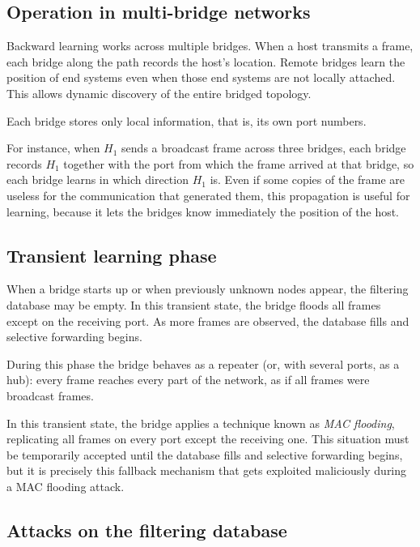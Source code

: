 \subsection{Operation in multi-bridge networks}

Backward learning works across multiple bridges. When a host transmits a frame, each bridge along the path records the host's location. Remote bridges learn the position of end systems even when those end systems are not locally attached. This allows dynamic discovery of the entire bridged topology.

Each bridge stores only local information, that is, its own port numbers. 

\begin{center}
\end{center}

For instance, when $H_1$ sends a broadcast frame across three bridges, each bridge records $H_1$ together with the port from which the frame arrived at that bridge, so each bridge learns in which direction $H_1$ is. Even if some copies of the frame are useless for the communication that generated them, this propagation is useful for learning, because it lets the bridges know immediately the position of the host.

\subsection{Transient learning phase}

When a bridge starts up or when previously unknown nodes appear, the filtering database may be empty. In this transient state, the bridge floods all frames except on the receiving port. As more frames are observed, the database fills and selective forwarding begins.

During this phase the bridge behaves as a repeater (or, with several ports, as a hub): every frame reaches every part of the network, as if all frames were broadcast frames.


In this transient state, the bridge applies a technique known as \textit{MAC flooding}, replicating all frames on every port except the receiving one. This situation must be temporarily accepted until the database fills and selective forwarding begins, but it is precisely this fallback mechanism that gets exploited maliciously during a MAC flooding attack.

\subsection{Attacks on the filtering database}

